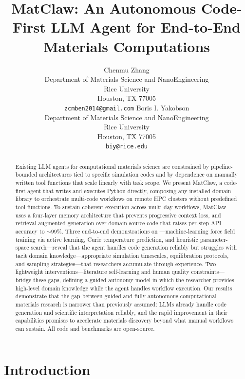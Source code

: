 \documentclass{article}
\title{MatClaw: An Autonomous Code-First LLM Agent for End-to-End Materials Computations}
\author{
  Chenmu Zhang \\
  Department of Materials Science and NanoEngineering \\
  Rice University \\
  Houston, TX 77005 \\
  \texttt{zcmben2014@gmail.com}
  \And
  Boris I. Yakobson \\
  Department of Materials Science and NanoEngineering \\
  Rice University \\
  Houston, TX 77005 \\
  \texttt{biy@rice.edu}
}
\begin{document}
\maketitle

\begin{abstract}
Existing LLM agents for computational materials science are constrained by pipeline-bounded architectures tied to specific simulation codes and by dependence on manually written tool functions that scale linearly with task scope.
We present MatClaw, a code-first agent that writes and executes Python directly, composing any installed domain library to orchestrate multi-code workflows on remote HPC clusters without predefined tool functions.
To sustain coherent execution across multi-day workflows, MatClaw uses a four-layer memory architecture that prevents progressive context loss, and retrieval-augmented generation over domain source code that raises per-step API accuracy to ${\sim}$99\%.
Three end-to-end demonstrations on ---machine-learning force field training via active learning, Curie temperature prediction, and heuristic parameter-space search---reveal that the agent handles code generation reliably but struggles with tacit domain knowledge---appropriate simulation timescales, equilibration protocols, and sampling strategies---that researchers accumulate through experience.
Two lightweight interventions---literature self-learning and human quality constraints---bridge these gaps, defining a guided autonomy model in which the researcher provides high-level domain knowledge while the agent handles workflow execution.
Our results demonstrate that the gap between guided and fully autonomous computational materials research is narrower than previously assumed: LLMs already handle code generation and scientific interpretation reliably, and the rapid improvement in their capabilities promises to accelerate materials discovery beyond what manual workflows can sustain. All code and benchmarks are open-source.
\end{abstract}

\section{Introduction}
\label{sec:intro}
\end{document}
